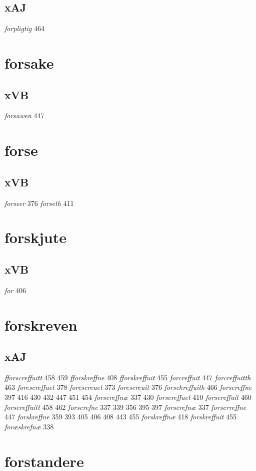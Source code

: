 \documentclass[a4paper,twocolumn]{article}
\begin{document}
\subsection{xAJ}
\label{sec:org74a8b34}
\emph{forpligtig} 464 
\section{forsake}
\label{sec:org2aedd4f}
\subsection{xVB}
\label{sec:org095eabc}
\emph{forsawen} 447 
\section{forse}
\label{sec:org7c88d11}
\subsection{xVB}
\label{sec:org4bb78b3}
\emph{forseer} 376 \emph{forseth} 411 
\section{forskjute}
\label{sec:orgd553d04}
\subsection{xVB}
\label{sec:org407695e}
\emph{for} 406 
\section{forskreven}
\label{sec:org567f115}
\subsection{xAJ}
\label{sec:org501b160}
\emph{fforscreffuitt} 458 459 \emph{fforskreffne} 408 \emph{fforskreffuit} 455 \emph{forcreffuit} 447 \emph{forcreffuitth} 463 \emph{forescreffuet} 378 \emph{forescreuet} 373 \emph{forescreuit} 376 \emph{forschreffuith} 466 \emph{forscreffne} 397 416 430 432 447 451 454 \emph{forscreffnæ} 337 430 \emph{forscreffuet} 410 \emph{forscreffuit} 460 \emph{forscreffuitt} 458 462 \emph{forscrefne} 337 339 356 395 397 \emph{forscrefnæ} 337 \emph{forscrreffne} 447 \emph{forskreffne} 359 393 405 406 408 443 455 \emph{forskreffnæ} 418 \emph{forskreffuit} 455 \emph{foræskrefnæ} 338 
\section{forstandere}
\label{sec:org7f69fa4}
\end{document}
